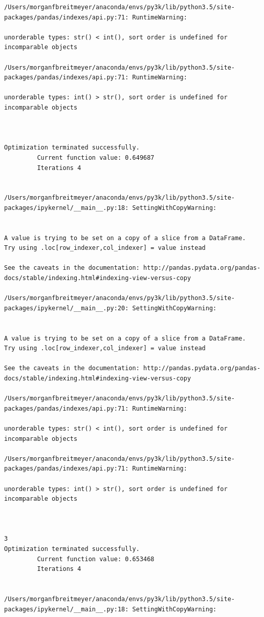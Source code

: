 \begin{lstlisting}
/Users/morganfbreitmeyer/anaconda/envs/py3k/lib/python3.5/site-packages/pandas/indexes/api.py:71: RuntimeWarning:

unorderable types: str() < int(), sort order is undefined for incomparable objects

/Users/morganfbreitmeyer/anaconda/envs/py3k/lib/python3.5/site-packages/pandas/indexes/api.py:71: RuntimeWarning:

unorderable types: int() > str(), sort order is undefined for incomparable objects



Optimization terminated successfully.
         Current function value: 0.649687
         Iterations 4


/Users/morganfbreitmeyer/anaconda/envs/py3k/lib/python3.5/site-packages/ipykernel/__main__.py:18: SettingWithCopyWarning:


A value is trying to be set on a copy of a slice from a DataFrame.
Try using .loc[row_indexer,col_indexer] = value instead

See the caveats in the documentation: http://pandas.pydata.org/pandas-docs/stable/indexing.html#indexing-view-versus-copy

/Users/morganfbreitmeyer/anaconda/envs/py3k/lib/python3.5/site-packages/ipykernel/__main__.py:20: SettingWithCopyWarning:


A value is trying to be set on a copy of a slice from a DataFrame.
Try using .loc[row_indexer,col_indexer] = value instead

See the caveats in the documentation: http://pandas.pydata.org/pandas-docs/stable/indexing.html#indexing-view-versus-copy

/Users/morganfbreitmeyer/anaconda/envs/py3k/lib/python3.5/site-packages/pandas/indexes/api.py:71: RuntimeWarning:

unorderable types: str() < int(), sort order is undefined for incomparable objects

/Users/morganfbreitmeyer/anaconda/envs/py3k/lib/python3.5/site-packages/pandas/indexes/api.py:71: RuntimeWarning:

unorderable types: int() > str(), sort order is undefined for incomparable objects



3
Optimization terminated successfully.
         Current function value: 0.653468
         Iterations 4


/Users/morganfbreitmeyer/anaconda/envs/py3k/lib/python3.5/site-packages/ipykernel/__main__.py:18: SettingWithCopyWarning:



\end{lstlisting}
